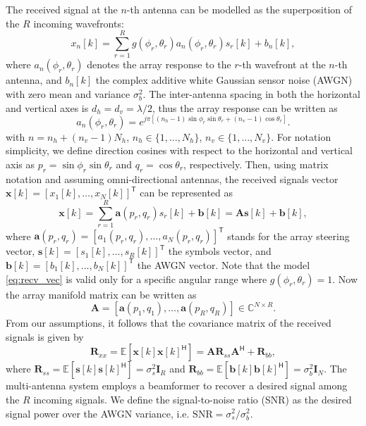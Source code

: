 \documentclass{cta-author}
\newcommand{\bmm}[1]{\ensuremath{\mathbb{#1}}}				%
\newcommand{\tran}{\mathsf{T}}						%
\newcommand{\hermit}{\mathsf{H}}					%
\newcommand{\esp}[1]{\ensuremath{\mathbb{E}\left[#1\right]}}		%
\newcommand{\Rss}{\bm{R}_{ss}}
\newcommand{\Rbb}{\bm{R}_{bb}}
\newcommand{\Rxx}{\bm{R}_{xx}}
\begin{document}
The received signal at the $n$-th antenna can be modelled as the superposition of the $R$ incoming wavefronts:
\begin{equation} \label{eq:recv}
	x_n[k] = \sum_{r=1}^R g(\phi_r, \theta_r) a_n(\phi_r, \theta_r) s_r[k] + b_n[k],
\end{equation}
where $a_n(\phi_r, \theta_r)$ denotes the array response to the $r$-th wavefront at the $n$-th antenna, and $b_n[k]$ the complex additive white Gaussian sensor noise (AWGN) with zero mean and variance $\sigma_b^2$. The inter-antenna spacing in both the horizontal and vertical axes is $d_h=d_v=\lambda/2$, thus the array response can be written as
\begin{equation} \label{eq:antresp}
	a_n(\phi_r, \theta_r) = e^{j \pi[(n_h-1)\sin\phi_r\sin\theta_r+(n_v-1)\cos\theta_r]}.
\end{equation}
with $n = n_h + (n_v-1)N_h$, $n_h \in \{1,\ldots, N_h\}$, $n_v \in \{1,\ldots, N_v\}$. For notation simplicity, we define direction cosines with respect to the horizontal and vertical axis as $p_r = \sin\phi_r\sin\theta_r$ and $q_r = \cos\theta_r$, respectively. Then, using matrix notation and assuming omni-directional antennas, the received signals vector ${\bm{x}[k] = \left[ x_1[k], \ldots, x_N[k] \right]^\tran}$ can be represented as
	\begin{equation}
	\bm{x}[k] = \sum_{r=1}^R \bm{a}(p_r, q_r) s_r[k] + \bm{b}[k] = \bm{A} \bm{s}[k] + \bm{b}[k], \label{eq:recv_vec}
	\end{equation}
where $\bm{a}(p_r, q_r) = \left[ a_1(p_r, q_r), \ldots, a_N(p_r, q_r)\right]^\tran$ stands for the array steering vector, $\bm{s}[k] = \left[ s_1[k], \ldots, s_R[k]\right]^\tran$ the symbols vector, and $\bm{b}[k]=[b_1[k],\ldots, b_N[k]]^\tran$ the AWGN vector. Note that the model \eqref{eq:recv_vec} is valid only for a specific angular range where $g(\phi_r, \theta_r) = 1$. Now the array manifold matrix can be written as
\begin{equation} \label{eq:array_manifold}
\bm{A} = [ \bm{a}(p_1, q_1), \ldots, \bm{a}(p_R, q_R) ] \in \bmm{C}^{N \times R}.
\end{equation}
From our assumptions, it follows that the covariance matrix of the received signals is given by
\begin{equation}
\Rxx = \esp{\bm{x}[k]\bm{x}[k]^\hermit} = \bm{A} \Rss \bm{A}^\hermit + \Rbb,
\end{equation}
where $\Rss=\esp{\bm{s}[k]\bm{s}[k]^\hermit} = \sigma_s^2 \bm{I}_R$ and $\Rbb = \esp{\bm{b}[k] \bm{b}[k]^\hermit} = \sigma_b^2 \bm{I}_{N}$. The multi-antenna system employs a beamformer to recover a desired signal among the $R$ incoming signals. We define the signal-to-noise ratio (SNR) as the desired signal power over the AWGN variance, i.e. $\text{SNR} = \sigma_s^2 / \sigma_b^2$.
\end{document}
